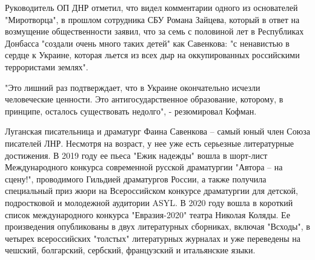 Руководитель ОП ДНР отметил, что видел комментарии одного из основателей
"Миротворца", в прошлом сотрудника СБУ Романа Зайцева, который в ответ на
возмущение общественности заявил, что за семь с половиной лет в Республиках
Донбасса "создали очень много таких детей" как Савенкова: "с ненавистью в
сердце к Украине, которая льется из всех дыр на оккупированных российскими
террористами землях".

"Это лишний раз подтверждает, что в Украине окончательно исчезли человеческие
ценности. Это антигосударственное образование, которому, в принципе, осталось
существовать недолго", - резюмировал Кофман.

Луганская писательница и драматург Фаина Савенкова – самый юный член Союза
писателей ЛНР. Несмотря на возраст, у нее уже есть серьезные литературные
достижения. В 2019 году ее пьеса "Ежик надежды" вошла в шорт-лист
Международного конкурса современной русской драматургии "Автора – на сцену!",
проводимого Гильдией драматургов России, а также получила специальный приз жюри
на Всероссийском конкурсе драматургии для детской, подростковой и молодежной
аудитории ASYL. В 2020 году вошла в короткий список международного конкурса
"Евразия-2020" театра Николая Коляды. Ее произведения опубликованы в двух
литературных сборниках, включая "Всходы", в четырех всероссийских "толстых"
литературных журналах и уже переведены на чешский, болгарский, сербский,
французский и итальянские языки.

